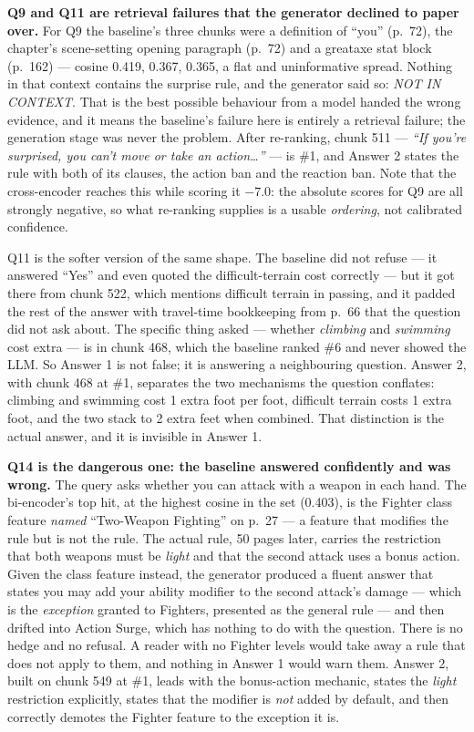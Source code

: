 \documentclass[11pt,a4paper]{article}
\begin{document}
\textbf{Q9 and Q11 are retrieval failures that the generator declined to
paper over.} For Q9 the baseline's three chunks were a definition of ``you''
(p.~72), the chapter's scene-setting opening paragraph (p.~72) and a greataxe
stat block (p.~162) --- cosine 0.419, 0.367, 0.365, a flat and uninformative
spread. Nothing in that context contains the surprise rule, and the generator
said so: \textit{NOT IN CONTEXT}. That is the best possible behaviour from a
model handed the wrong evidence, and it means the baseline's failure here is
entirely a retrieval failure; the generation stage was never the problem. After
re-ranking, chunk 511 --- \textit{``If you're surprised, you can't move or take
an action\ldots''} --- is \#1, and Answer 2 states the rule with both of its
clauses, the action ban and the reaction ban. Note that the cross-encoder
reaches this while scoring it $-7.0$: the absolute scores for Q9 are all
strongly negative, so what re-ranking supplies is a usable \emph{ordering},
not calibrated confidence.

Q11 is the softer version of the same shape. The baseline did not refuse ---
it answered ``Yes'' and even quoted the difficult-terrain cost correctly --- but
it got there from chunk 522, which mentions difficult terrain in passing, and
it padded the rest of the answer with travel-time bookkeeping from p.~66 that
the question did not ask about. The specific thing asked --- whether
\emph{climbing} and \emph{swimming} cost extra --- is in chunk 468, which the
baseline ranked \#6 and never showed the LLM. So Answer 1 is not false; it is
answering a neighbouring question. Answer 2, with chunk 468 at \#1, separates
the two mechanisms the question conflates: climbing and swimming cost 1 extra
foot per foot, difficult terrain costs 1 extra foot, and the two stack to 2
extra feet when combined. That distinction is the actual answer, and it is
invisible in Answer 1.

\textbf{Q14 is the dangerous one: the baseline answered confidently and was
wrong.} The query asks whether you can attack with a weapon in each hand. The
bi-encoder's top hit, at the highest cosine in the set (0.403), is the Fighter
class feature \emph{named} ``Two-Weapon Fighting'' on p.~27 --- a feature that
modifies the rule but is not the rule. The actual rule, 50 pages later, carries
the restriction that both weapons must be \emph{light} and that the second
attack uses a bonus action. Given the class feature instead, the generator
produced a fluent answer that states you may add your ability modifier to the
second attack's damage --- which is the \emph{exception} granted to Fighters,
presented as the general rule --- and then drifted into Action Surge, which has
nothing to do with the question. There is no hedge and no refusal. A reader
with no Fighter levels would take away a rule that does not apply to them, and
nothing in Answer 1 would warn them. Answer 2, built on chunk 549 at \#1,
leads with the bonus-action mechanic, states the \emph{light} restriction
explicitly, states that the modifier is \emph{not} added by default, and then
correctly demotes the Fighter feature to the exception it is.
\end{document}
